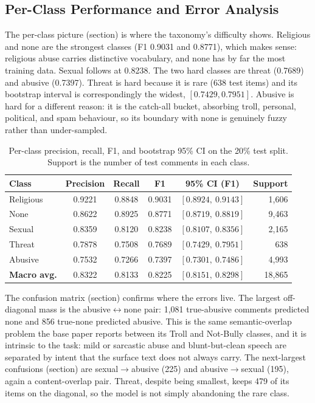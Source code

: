 \documentclass[11pt,a4paper]{article}
\def\cref#1{section}%
\def\emph#1{#1}%
\begin{document}
\subsection{Per-Class Performance and Error Analysis}
\label{sec:perclass-results}

The per-class picture (\cref{tab:perclass}) is where the taxonomy's difficulty shows. \emph{Religious} and \emph{none} are the strongest classes (F1 0.9031 and 0.8771), which makes sense: religious abuse carries distinctive vocabulary, and \emph{none} has by far the most training data. \emph{Sexual} follows at 0.8238. The two hard classes are \emph{threat} (0.7689) and \emph{abusive} (0.7397). \emph{Threat} is hard because it is rare (638 test items) and its bootstrap interval is correspondingly the widest, $[0.7429, 0.7951]$. \emph{Abusive} is hard for a different reason: it is the catch-all bucket, absorbing troll, personal, political, and spam behaviour, so its boundary with \emph{none} is genuinely fuzzy rather than under-sampled.

\begin{table}[!htbp]
\centering
\caption{Per-class precision, recall, F1, and bootstrap 95\% CI on the 20\% test split. Support is the number of test comments in each class.}
\label{tab:perclass}
\small
\begin{tabular}{@{}lccccr@{}}
\toprule
\textbf{Class} & \textbf{Precision} & \textbf{Recall} & \textbf{F1} & \textbf{95\% CI (F1)} & \textbf{Support} \\
\midrule
Religious & 0.9221 & 0.8848 & 0.9031 & $[0.8924,\ 0.9143]$ & 1{,}606 \\
None & 0.8622 & 0.8925 & 0.8771 & $[0.8719,\ 0.8819]$ & 9{,}463 \\
Sexual & 0.8359 & 0.8120 & 0.8238 & $[0.8107,\ 0.8356]$ & 2{,}165 \\
Threat & 0.7878 & 0.7508 & 0.7689 & $[0.7429,\ 0.7951]$ & 638 \\
Abusive & 0.7532 & 0.7266 & 0.7397 & $[0.7301,\ 0.7486]$ & 4{,}993 \\
\midrule
\textbf{Macro avg.} & 0.8322 & 0.8133 & 0.8225 & $[0.8151,\ 0.8298]$ & 18{,}865 \\
\bottomrule
\end{tabular}
\end{table}

The confusion matrix (\cref{fig:confusion}) confirms where the errors live. The largest off-diagonal mass is the \emph{abusive}$\leftrightarrow$\emph{none} pair: 1{,}081 true-\emph{abusive} comments predicted \emph{none} and 856 true-\emph{none} predicted \emph{abusive}. This is the same semantic-overlap problem the base paper reports between its Troll and Not-Bully classes, and it is intrinsic to the task: mild or sarcastic abuse and blunt-but-clean speech are separated by intent that the surface text does not always carry. The next-largest confusions (\cref{fig:topconf}) are \emph{sexual}$\to$\emph{abusive} (225) and \emph{abusive}$\to$\emph{sexual} (195), again a content-overlap pair. \emph{Threat}, despite being smallest, keeps 479 of its items on the diagonal, so the model is not simply abandoning the rare class.
\end{document}
